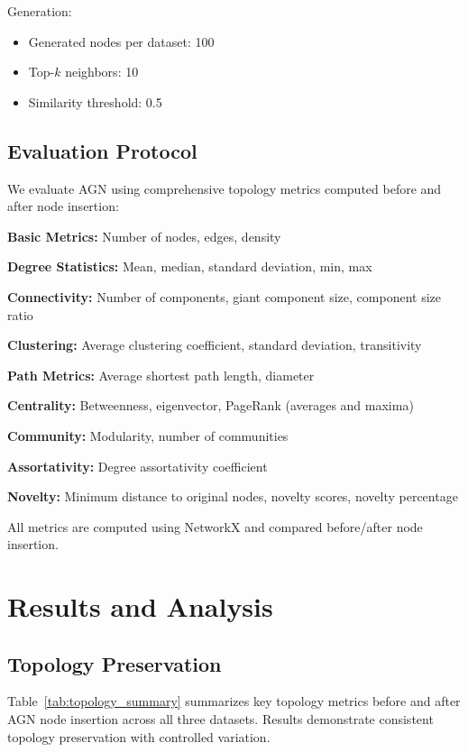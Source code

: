 \documentclass[12pt]{article}
\begin{document}
Generation:
\begin{itemize}
    \item Generated nodes per dataset: 100
    \item Top-$k$ neighbors: 10
    \item Similarity threshold: 0.5
\end{itemize}

\subsection{Evaluation Protocol}

We evaluate AGN using comprehensive topology metrics computed before and after node insertion:

\textbf{Basic Metrics:} Number of nodes, edges, density

\textbf{Degree Statistics:} Mean, median, standard deviation, min, max

\textbf{Connectivity:} Number of components, giant component size, component size ratio

\textbf{Clustering:} Average clustering coefficient, standard deviation, transitivity

\textbf{Path Metrics:} Average shortest path length, diameter

\textbf{Centrality:} Betweenness, eigenvector, PageRank (averages and maxima)

\textbf{Community:} Modularity, number of communities

\textbf{Assortativity:} Degree assortativity coefficient

\textbf{Novelty:} Minimum distance to original nodes, novelty scores, novelty percentage

All metrics are computed using NetworkX \cite{hagberg2008exploring} and compared before/after node insertion.

\section{Results and Analysis}

\subsection{Topology Preservation}

Table~\ref{tab:topology_summary} summarizes key topology metrics before and after AGN node insertion across all three datasets. Results demonstrate consistent topology preservation with controlled variation.
\end{document}
